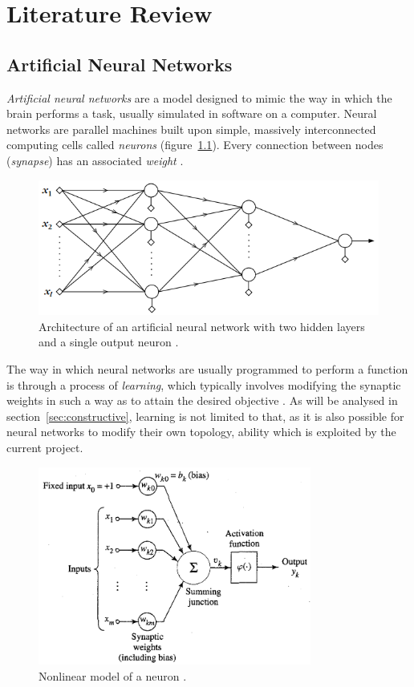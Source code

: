 \documentclass[11pt,a4paper]{report}
\begin{document}
	
	\chapter{Literature Review}
		\section{Artificial Neural Networks}
		\emph{Artificial neural networks} are a model designed to mimic the way in which the brain performs a task, usually simulated in software on a computer. Neural networks are parallel machines built upon simple, massively interconnected computing cells called \emph{neurons} (figure~\ref{fig:multilayer}). Every connection between nodes (\emph{synapse}) has an associated \emph{weight} \cite{haykin2004comprehensive}.
		
		\begin{figure}[h]
			\centering
			\includegraphics[width=\textwidth]{multilayer}
			\caption{Architecture of an artificial neural network with two hidden layers and a single output neuron \cite{theodoridis2008pattern}.}
			\label{fig:multilayer}
		\end{figure}		
		
		The way in which neural networks are usually programmed to perform a function is through a process of \emph{learning}, which typically involves modifying the synaptic weights in such a way as to attain the desired objective \cite{haykin2004comprehensive}. As will be analysed in section~\ref{sec:constructive}, learning is not limited to that, as it is also possible for neural networks to modify their own topology, ability which is exploited by the current project.
		
		\newpage
		
		\begin{figure}[t]
			\centering
			\includegraphics[width=0.8\textwidth]{neuron}
			\caption{Nonlinear model of a neuron \cite{haykin2004comprehensive}.}
			\label{fig:neuron}
		\end{figure}
		
\end{document}
